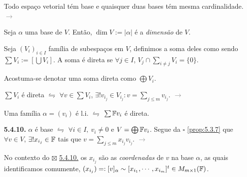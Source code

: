 \begin{theorem}
    Todo espaço vetorial tém base e quaisquer duas bases tém mesma cardinalidade. \textcolor{gray}{\(\rightarrow \) \cite[Pág. 185]{MA719}}%
\end{theorem}

\begin{definition}
    Seja \(\alpha\) uma base de \(V\). Então, \(\dim V := |\alpha|\) é a \emph{dimensão} de \(V\).  
\end{definition}

\begin{definition}
    Seja \((V_i)_{i\in I}\) família de subespaços em \(V\), definimos a soma deles como sendo \(\sum V_i := \left[\bigcup V_i\right]\). A soma é direta se \(\forall j\in I\), \(V_j \cap \underset{i\neq j}{\sum} V_i =\{0\}\). 
\end{definition}

\begin{note}
    Acostuma-se denotar uma soma direta como \(\bigoplus V_i\).
\end{note}

\begin{proposition}
    \label{prop:5.3.7}
    \(\sum V_i\) é direta \(\leftrightharpoons\) \(\forall v\in \sum V_i\), \(\exists! v_{i_j} \in V_{i_j} : v = \underset{j\leq m}{\sum} v_{i_j}\). \textcolor{gray}{\(\rightarrow\)  \cite[Pág. 174]{MA719}} 
\end{proposition}

\begin{proposition}
    \label{prop:5.4.6}
    Uma família \(\alpha = (v_i)\) é l.i. \(\leftrightharpoons\) \(\sum \mathbb{F} v_i\) é direta. 
\end{proposition}

\newcommand{\comentario}[1]{\textcolor{gray}{\(\rightarrow\) #1}}

\hypertarget{corol5410}{}
\begin{corollary}
    \textbf{5.4.10.} \(\alpha\) é base \(\leftrightharpoons\) \(\forall i\in I,\ v_i \neq 0\) e \(V = \bigoplus \mathbb{F} v_i\). Segue da \(\square \) \ref{prop:5.3.7} que \(\forall v\in V\), \(\exists !x_{i_j} \in \mathbb{F}\) tais que \(v = \underset{j\leq m }{\sum} x_{i_j}v_{i_j}\). \comentario{\cite[Pág. 178]{MA719}}
\end{corollary}

\begin{note}
No contexto do {\scriptsize \(\boxtimes\)} \hyperlink{corol5410}{5.4.10.} os \(x_{i_j}\) são as \emph{coordenadas} de \(v\) na base \(\alpha\), as quais identificamos comumente,  
\((x_{i_j}) =: [v]_\alpha \sim  [ x_{i_1}, \cdots,  x_{i_m}]^t \in M_{m\times 1}(\mathbb{F})\).
\end{note}
\- \vspace{-1.4cm}
\propositionnum{ \hspace{-0.3cm}}


